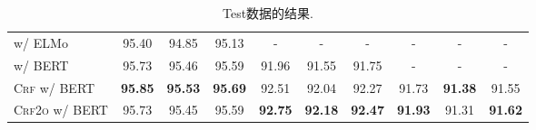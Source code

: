\begin{table*}[tb]
\begin{tabularx}{\textwidth}{lccccccccc}
        \cite{kitaev-klein-2018-constituency} w/ ELMo   & 95.40                    & 94.85                      & 95.13                    & -                        & -                        & -                        & -              & -              & -              \\
        \cite{kitaev-etal-2019-multilingual} w/ BERT    & 95.73                    & 95.46                      & 95.59                    & 91.96                    & 91.55                    & 91.75                    & -              & -              & -              \\[3pt]
        \textsc{Crf} w/ BERT                            & \textbf{95.85}           & \textbf{95.53}             & \textbf{95.69}           & 92.51                    & 92.04                    & 92.27                    & 91.73          & \textbf{91.38} & 91.55          \\
        \textsc{Crf2o} w/ BERT                          & 95.73                    & 95.45                      & 95.59                    & \textbf{92.75}           & \textbf{92.18}           & \textbf{92.47}           & \textbf{91.93} & 91.31          & \textbf{91.62} \\
        \bottomrule
    \end{tabularx}
    \caption{Test数据的结果.}
    \label{table:con-test}
\end{table*}

